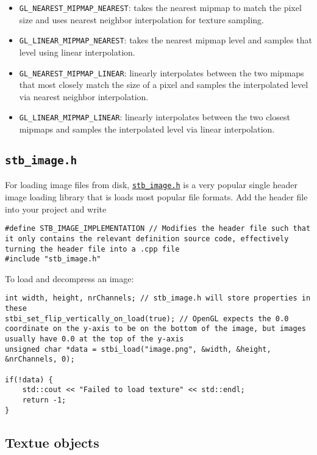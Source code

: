 \documentclass[8pt, table, xcdraw]{article}%
\begin{document}
\begin{itemize}
    \item \lstinline{GL_NEAREST_MIPMAP_NEAREST}: takes the nearest mipmap to match the pixel size and uses nearest neighbor interpolation for texture sampling.
    \item \lstinline{GL_LINEAR_MIPMAP_NEAREST}: takes the nearest mipmap level and samples that level using linear interpolation.
    \item \lstinline{GL_NEAREST_MIPMAP_LINEAR}: linearly interpolates between the two mipmaps that most closely match the size of a pixel and samples the interpolated level via nearest neighbor interpolation.
    \item \lstinline{GL_LINEAR_MIPMAP_LINEAR}: linearly interpolates between the two closest mipmaps and samples the interpolated level via linear interpolation.
\end{itemize}

\subsection{\lstinline{stb_image.h}}

For loading image files from disk, \href{https://github.com/nothings/stb/blob/master/stb_image.h}{\lstinline{stb_image.h}} is a very popular single header image loading library that is loads most popular file formats. Add the header file into your project and write

\begin{lstlisting}
#define STB_IMAGE_IMPLEMENTATION // Modifies the header file such that it only contains the relevant definition source code, effectively turning the header file into a .cpp file
#include "stb_image.h"
\end{lstlisting}

To load and decompress an image:

\begin{lstlisting}
int width, height, nrChannels; // stb_image.h will store properties in these
stbi_set_flip_vertically_on_load(true); // OpenGL expects the 0.0 coordinate on the y-axis to be on the bottom of the image, but images usually have 0.0 at the top of the y-axis
unsigned char *data = stbi_load("image.png", &width, &height, &nrChannels, 0);

if(!data) {
    std::cout << "Failed to load texture" << std::endl;
    return -1;
}
\end{lstlisting}

\subsection{Textue objects}
\end{document}
